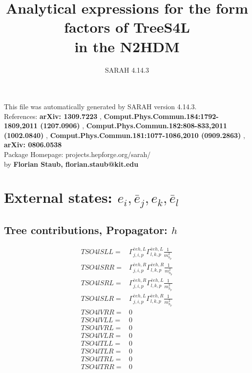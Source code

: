 \documentclass[A4,landscape]{article}
\begin{document}
\title{Analytical expressions for the form factors of TreeS4L\\ in the N2HDM } 
 \author{SARAH 4.14.3} 
 \maketitle 
 \vspace{10cm} 
This file was automatically generated by SARAH version 4.14.3.  \\ 
References: {\bf arXiv: 1309.7223 }, {\bf Comput.Phys.Commun.184:1792-1809,2011 (1207.0906) }, {\bf Comput.Phys.Commun.182:808-833,2011 (1002.0840) }, {\bf Comput.Phys.Commun.181:1077-1086,2010 (0909.2863) }, {\bf arXiv: 0806.0538 } \\ 
Package Homepage: projects.hepforge.org/sarah/ \\ 
by {\bf Florian Staub, florian.staub@kit.edu} 
 \pagebreak 
 \tableofcontents 
 \pagebreak 
\section{External states: ${e_{{i}}, \bar{e}_{{j}}, e_{{k}}, \bar{e}_{{l}}}$} 
\subsection{Tree contributions, Propagator: $h$} 

\begin{align} 
  TSO4lSLL= & \Gamma^{\bar{e}e h ,L}_{j, i, p} \Gamma^{\bar{e}e h ,L}_{l, k, p} \frac{1}{m^2_{h_{{p}}}} \\ 
  TSO4lSRR= & \Gamma^{\bar{e}e h ,R}_{j, i, p} \Gamma^{\bar{e}e h ,R}_{l, k, p} \frac{1}{m^2_{h_{{p}}}} \\ 
  TSO4lSRL= & \Gamma^{\bar{e}e h ,R}_{j, i, p} \Gamma^{\bar{e}e h ,L}_{l, k, p} \frac{1}{m^2_{h_{{p}}}} \\ 
  TSO4lSLR= & \Gamma^{\bar{e}e h ,L}_{j, i, p} \Gamma^{\bar{e}e h ,R}_{l, k, p} \frac{1}{m^2_{h_{{p}}}} \\ 
  TSO4lVRR= & 0 \\ 
  TSO4lVLL= & 0 \\ 
  TSO4lVRL= & 0 \\ 
  TSO4lVLR= & 0 \\ 
  TSO4lTLL= & 0 \\ 
  TSO4lTLR= & 0 \\ 
  TSO4lTRL= & 0 \\ 
  TSO4lTRR= & 0 \\ 
\end{align} 
\end{document}
